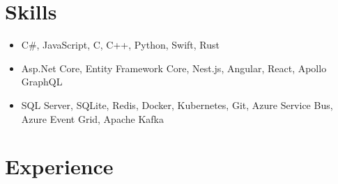 \documentclass[11pt,letterpaper,sans]{moderncv}
\begin{document}
\maketitle

\section{Skills}
\begin{itemize}
    \item C\#, JavaScript, C, C++, Python, Swift, Rust
\end{itemize}
\begin{itemize}
    \item Asp.Net Core, Entity Framework Core, Nest.js, Angular, React, Apollo GraphQL
\end{itemize}
\begin{itemize}
    \item SQL Server, SQLite, Redis, Docker, Kubernetes, Git, Azure Service Bus, Azure Event Grid, Apache Kafka
\end{itemize}

\section{Experience}
\end{document}

